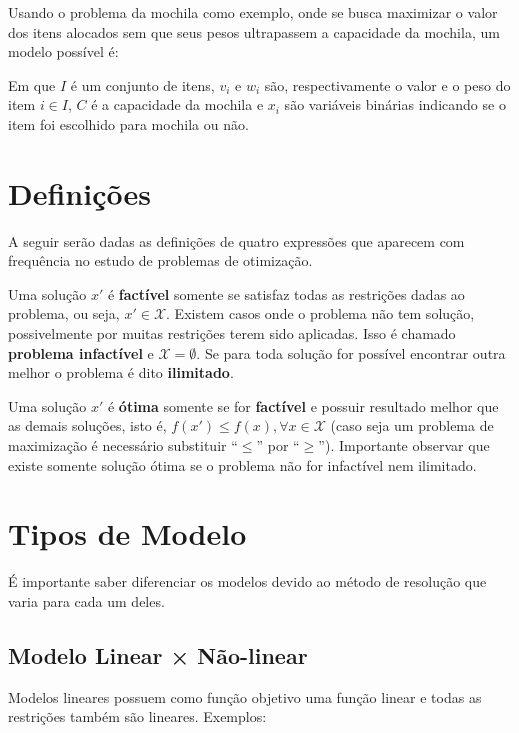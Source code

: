 Usando o problema da mochila como exemplo, onde se busca maximizar o valor dos itens alocados
sem que seus pesos ultrapassem a capacidade da mochila,
um modelo possível é:



Em que $I$ é um conjunto de itens, $v_{i}$ e $w_{i}$ são, respectivamente o valor e o peso do item
$i \in I$, $C$ é a capacidade da mochila e $x_{i}$ são variáveis binárias indicando se o
item foi escolhido para mochila ou não.


\section{Definições}\label{sec:definicoes}

A seguir serão dadas as definições de quatro expressões que aparecem com frequência no estudo de problemas de otimização.

Uma solução $x'$ é \textbf{factível} somente se satisfaz todas as restrições dadas ao problema, ou seja, $x' \in \mathcal{X}$.
Existem casos onde o problema não tem solução, possivelmente por muitas restrições terem sido aplicadas.
Isso é chamado \textbf{problema infactível} e $\mathcal{X} = \emptyset$.
Se para toda solução for possível encontrar outra melhor o problema é dito \textbf{ilimitado}.

Uma solução $x'$ é \textbf{ótima} somente se for \textbf{factível} e possuir resultado melhor que as demais soluções, isto é, $f(x') \le f(x), \forall x \in \mathcal{X}$ (caso seja um problema de maximização é necessário substituir “$\le$” por “$\ge$”).
Importante observar que existe somente solução ótima se o problema não for infactível nem ilimitado.


\section{Tipos de Modelo}\label{sec:tipos-de-modelo}

É importante saber diferenciar os modelos devido ao método de resolução que varia para cada um deles.

\subsection{Modelo Linear × Não-linear}\label{subsec:modelo-linear}


Modelos lineares possuem como função objetivo uma função linear e todas as restrições também são lineares.
Exemplos:

